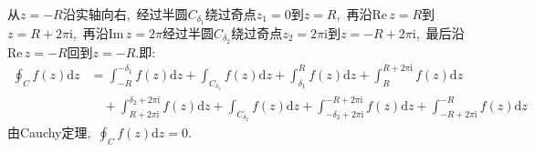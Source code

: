\documentclass[a4paper,fontset=windows]{ctexart}
\begin{document}
\begin{itemize}
从$z=-R$沿实轴向右,\ 经过半圆$C_{\delta_1}$绕过奇点$z_1=0$到$z=R$,\ 再沿$\mathrm{Re}\,z=R$到$z=R+2\pi\mathrm{i}$,\ 再沿$\mathrm{Im}\,z=2\pi$经过半圆$C_{\delta_2}$绕过奇点$z_2=2\pi\mathrm{i}$到$z=-R+2\pi\mathrm{i}$,\ 
最后沿$\mathrm{Re}\,z=-R$回到$z=-R$.即:
\begin{align*}
\oint_{C}f(z)\mathrm{d}z
&=\int_{-R}^{-\delta_1}f(z)\mathrm{d}z+
\int_{C_{\delta_1}}f(z)\mathrm{d}z+
\int_{\delta_1}^{R}f(z)\mathrm{d}z+
\int_{R}^{R+2\pi\mathrm{i}}f(z)\mathrm{d}z \\
&\quad +
\int_{R+2\pi\mathrm{i}}^{\delta_2+2\pi\mathrm{i}}f(z)\mathrm{d}z+
\int_{C_{\delta_2}}f(z)\mathrm{d}z+
\int_{-\delta_2+2\pi\mathrm{i}}^{-R+2\pi\mathrm{i}}f(z)\mathrm{d}z+
\int_{-R+2\pi\mathrm{i}}^{-R}f(z)\mathrm{d}z
\end{align*}
由Cauchy定理,\ $\oint_{C}f(z)\mathrm{d}z=0$.


\end{itemize}
\end{document}
